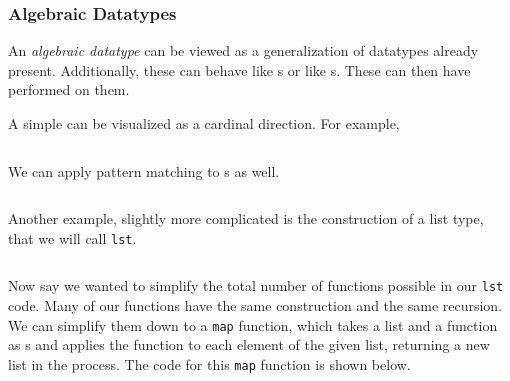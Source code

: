 \subsubsection{Algebraic Datatypes}\label{subsubsec:Functional-SML-Algebraic_Datatypes}
\begin{definition}\label{def:Algebraic_Datatype}
  An \emph{algebraic datatype} can be viewed as a generalization of datatypes already present.
  Additionally, these can behave like s or like s.
  These can then have  performed on them.
\end{definition}

A simple  can be visualized as a cardinal direction.
For example,
\inputminted[frame=lines,linenos]{sml}{./EDAP05-Concepts_Programming_Languages-Sections/Code/Algebraic_Datatype-Direction.sml}

We can apply pattern matching to s as well.
\inputminted[frame=lines,linenos]{sml}{./EDAP05-Concepts_Programming_Languages-Sections/Code/Algebraic_Datatype-Direction-Pattern_Match.sml}

Another example, slightly more complicated is the construction of a list type, that we will call \texttt{lst}.
\inputminted[frame=lines,linenos]{sml}{./EDAP05-Concepts_Programming_Languages-Sections/Code/Algebraic_Datatype-lst.sml}

Now say we wanted to simplify the total number of functions possible in our \texttt{lst} code.
Many of our functions have the same construction and the same recursion.
We can simplify them down to a \texttt{map} function, which takes a list and a function as s and applies the function to each element of the given list, returning a new list in the process.
The code for this \texttt{map} function is shown below.
\inputminted[frame=lines,linenos]{sml}{./EDAP05-Concepts_Programming_Languages-Sections/Code/lst-map.sml}

